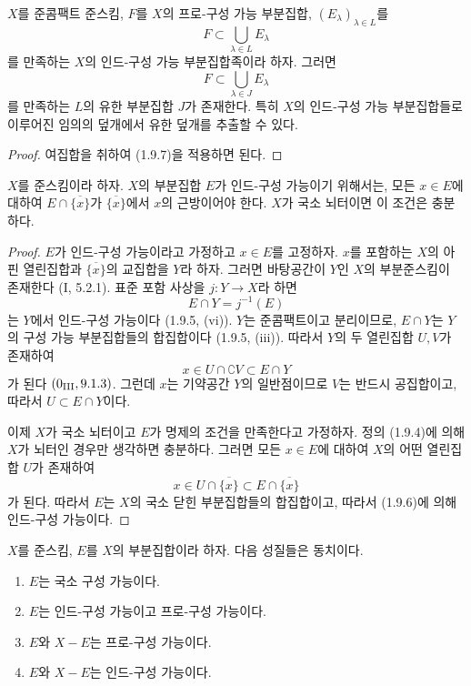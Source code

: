 \begin{corollary}[1.9.9]
\label{IV.1.9.9-fr}
$X$를 준콤팩트 준스킴, $F$를 $X$의 프로-구성 가능 부분집합,
$(E_\lambda)_{\lambda\in L}$를
\[
  F\subset\bigcup_{\lambda\in L}E_\lambda
\]
를 만족하는 $X$의 인드-구성 가능 부분집합족이라 하자. 그러면
\[
  F\subset\bigcup_{\lambda\in J}E_\lambda
\]
를 만족하는 $L$의 유한 부분집합 $J$가 존재한다. 특히 $X$의 인드-구성
가능 부분집합들로 이루어진 임의의 덮개에서 유한 덮개를 추출할 수 있다.
\end{corollary}

\begin{proof}
여집합을 취하여 (1.9.7)을 적용하면 된다.
\end{proof}

\begin{proposition}[1.9.10]
\label{IV.1.9.10-fr}
$X$를 준스킴이라 하자. $X$의 부분집합 $E$가 인드-구성 가능이기
위해서는, 모든 $x\in E$에 대하여
$E\cap\overline{\{x\}}$가 $\overline{\{x\}}$에서 $x$의 근방이어야
한다. $X$가 국소 뇌터이면 이 조건은 충분하다.
\end{proposition}

\begin{proof}
$E$가 인드-구성 가능이라고 가정하고 $x\in E$를 고정하자. $x$를
포함하는 $X$의 아핀 열린집합과 $\overline{\{x\}}$의 교집합을 $Y$라
하자. 그러면 바탕공간이 $Y$인 $X$의 부분준스킴이 존재한다
(I, 5.2.1). 표준 포함 사상을 $j:Y\to X$라 하면
\[
  E\cap Y=j^{-1}(E)
\]
는 $Y$에서 인드-구성 가능이다 (1.9.5, (vi)). $Y$는 준콤팩트이고
분리이므로, $E\cap Y$는 $Y$의 구성 가능 부분집합들의 합집합이다
(1.9.5, (iii)). 따라서 $Y$의 두 열린집합 $U,V$가 존재하여
\[
  x\in U\cap\complement V\subset E\cap Y
\]
가 된다 $(0\textsubscript{III}, 9.1.3)$. 그런데 $x$는 기약공간 $Y$의
일반점이므로 $V$는 반드시 공집합이고, 따라서 $U\subset E\cap Y$이다.

이제 $X$가 국소 뇌터이고 $E$가 명제의 조건을 만족한다고 가정하자.
정의 (1.9.4)에 의해 $X$가 뇌터인 경우만 생각하면 충분하다. 그러면
모든 $x\in E$에 대하여 $X$의 어떤 열린집합 $U$가 존재하여
\[
  x\in U\cap\overline{\{x\}}\subset E\cap\overline{\{x\}}
\]
가 된다. 따라서 $E$는 $X$의 국소 닫힌
부분집합들의 합집합이고, 따라서 (1.9.6)에 의해 인드-구성 가능이다.
\end{proof}

\begin{proposition}[1.9.11]
\label{IV.1.9.11-fr}
$X$를 준스킴, $E$를 $X$의 부분집합이라 하자. 다음 성질들은
동치이다.
\begin{enumerate}
  \item[a)] $E$는 국소 구성 가능이다.
  \item[b)] $E$는 인드-구성 가능이고 프로-구성 가능이다.
  \item[c)] $E$와 $X-E$는 프로-구성 가능이다.
  \item[d)] $E$와 $X-E$는 인드-구성 가능이다.
\end{enumerate}
\end{proposition}

